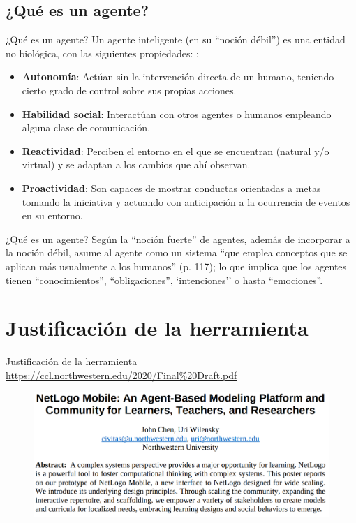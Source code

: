 \documentclass{beamer}
\begin{document}
\subsection{¿Qué es un agente?}
\begin{frame}{¿Qué es un agente?}
Un agente inteligente (en su ``noción débil'') es una entidad no biológica, con las siguientes propiedades: \cite{Wooldridge1995}:
\vspace{0.3cm}
\begin{itemize}
\item \textbf{Autonomía}: Actúan sin la intervención directa de un humano, teniendo cierto grado de control sobre sus propias acciones.
\vspace{0.2cm}
\pause
\item \textbf{Habilidad social}: Interactúan con otros agentes o humanos empleando alguna clase de comunicación.
\vspace{0.2cm}
\pause
\item \textbf{Reactividad}: Perciben el entorno en el que se encuentran (natural y/o virtual) y se adaptan a los cambios que ahí observan.
\vspace{0.2cm}
\pause
\item \textbf{Proactividad}: Son capaces de mostrar conductas orientadas a metas tomando la iniciativa y actuando con anticipación a la ocurrencia de eventos en su entorno.
\end{itemize}
\end{frame}

\begin{frame}{¿Qué es un agente?}
Según \citeauthor{Wooldridge1995} \citeyear{Wooldridge1995} la ``noción fuerte'' de agentes, además de incorporar a la noción débil, asume al agente como un sistema ``que emplea conceptos que se aplican más usualmente a los humanos'' (p. 117); lo que implica que los agentes tienen ``conocimientos'', ``obligaciones'', `intenciones'' o hasta ``emociones''.
    
\end{frame}



\section{Justificación de la herramienta}
\begin{frame}{Justificación de la herramienta}
\tiny{\textcolor{blue}{\url{https://ccl.northwestern.edu/2020/Final\%20Draft.pdf}}}
\begin{figure}
\centering
\includegraphics[width=.9\textwidth]{NetlogoJ.png}
\end{figure}
\cite{Chen2020}
\end{frame}
\end{document}
